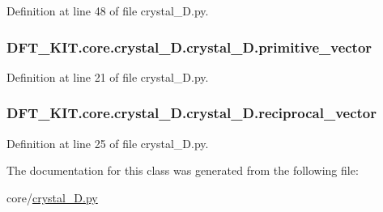 Definition at line 48 of file crystal\+\_\+D.\+py.

\hypertarget{class_d_f_t___k_i_t_1_1core_1_1crystal__3_d_1_1crystal__3_d_a8be1646b7a612989dc73502430a450c2}{
\subsubsection[{primitive\+\_\+vector}]{\setlength{\rightskip}{0pt plus 5cm}D\+F\+T\+\_\+\+K\+I\+T.\+core.\+crystal\+\_\+D.\+crystal\+\_\+D.\+primitive\+\_\+vector}}\label{class_d_f_t___k_i_t_1_1core_1_1crystal__3_d_1_1crystal__3_d_a8be1646b7a612989dc73502430a450c2}


Definition at line 21 of file crystal\+\_\+D.\+py.

\hypertarget{class_d_f_t___k_i_t_1_1core_1_1crystal__3_d_1_1crystal__3_d_ac792f9a47ced7b38b07d17d55e043d3b}{
\subsubsection[{reciprocal\+\_\+vector}]{\setlength{\rightskip}{0pt plus 5cm}D\+F\+T\+\_\+\+K\+I\+T.\+core.\+crystal\+\_\+D.\+crystal\+\_\+D.\+reciprocal\+\_\+vector}}\label{class_d_f_t___k_i_t_1_1core_1_1crystal__3_d_1_1crystal__3_d_ac792f9a47ced7b38b07d17d55e043d3b}


Definition at line 25 of file crystal\+\_\+D.\+py.



The documentation for this class was generated from the following file\+:\begin{DoxyCompactItemize}
\item 
core/\hyperlink{crystal__3_d_8py}{crystal\+\_\+D.\+py}\end{DoxyCompactItemize}
